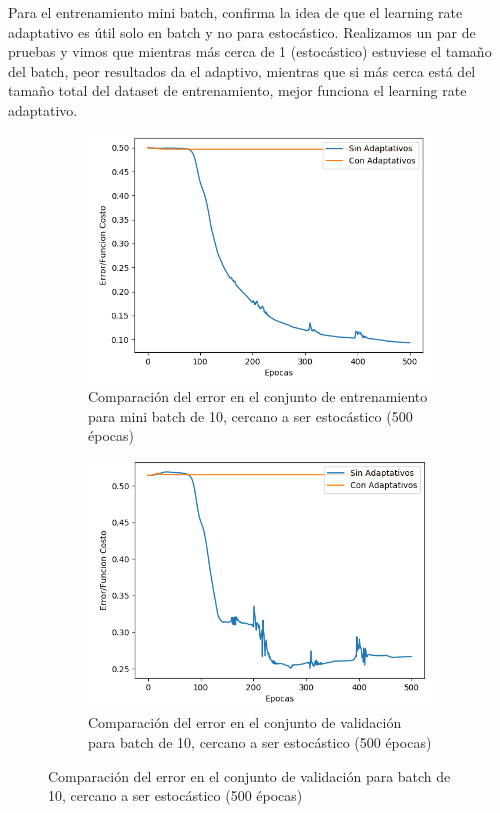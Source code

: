 Para el entrenamiento mini batch, confirma la idea de que el learning rate adaptativo es útil solo en batch y no para estocástico. Realizamos un par de
pruebas y vimos que mientras más cerca de 1 (estocástico) estuviese el tamaño del batch, peor resultados da el adaptivo, mientras que si más cerca está del
tamaño total del dataset de entrenamiento, mejor funciona el learning rate adaptativo. 

\begin{figure}[!htbp]
\centering
\begin{subfigure}{.5\textwidth}
  \centering
  \includegraphics[width=1\linewidth]{graficos/adaptativos_promedios_entrenamiento_batch.png}
  \caption{Comparación del error en el conjunto de entrenamiento para mini batch de 10, cercano a ser estocástico (500 épocas)}
  \label{fig:sub1}
\end{subfigure}%
\begin{subfigure}{.5\textwidth}
  \centering
  \includegraphics[width=1\linewidth]{graficos/adaptativos_promedios_validacion_batch.png}
  \caption{Comparación del error en el conjunto de validación para batch de 10, cercano a ser estocástico (500 épocas)}
  \label{fig:sub2}
\end{subfigure}
\end{figure}

